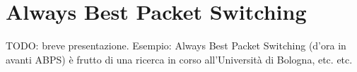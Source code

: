 \documentclass[12pt,a4paper,openright,twoside]{book}
\begin{document}

\clearpage{\pagestyle{empty}\cleardoublepage}

\chapter{Always Best Packet Switching}
TODO: breve presentazione. Esempio: Always Best Packet Switching
(d'ora in avanti ABPS) è frutto di una ricerca in corso all'Università
di Bologna, etc. etc.
\end{document}
